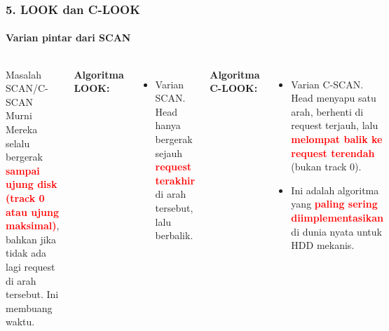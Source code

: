 \documentclass[t,aspectratio=169,xcolor=dvipsnames]{beamer}
\newcommand{\tem}[1]{\textbf{\textcolor{red}{#1}}}
\begin{document}
\begin{frame}
    \frametitle{5. LOOK dan C-LOOK}
    \framesubtitle{Varian pintar dari SCAN}
    \small
    \begin{columns}[T]
        \begin{block}{Masalah SCAN/C-SCAN Murni}
            Mereka selalu bergerak \tem{sampai ujung disk (track 0 atau ujung maksimal)}, bahkan jika tidak ada lagi request di arah tersebut. Ini membuang waktu.
        \end{block}
        
        \textbf{Algoritma LOOK:}
        \begin{itemize}
            \item Varian SCAN. Head hanya bergerak sejauh \tem{request terakhir} di arah tersebut, lalu berbalik.
        \end{itemize}

        \textbf{Algoritma C-LOOK:}
        \begin{itemize}
            \item Varian C-SCAN. Head menyapu satu arah, berhenti di request terjauh, lalu \tem{melompat balik ke request terendah} (bukan track 0).
            \item Ini adalah algoritma yang \tem{paling sering diimplementasikan} di dunia nyata untuk HDD mekanis.
        \end{itemize}
    \end{columns}
\end{frame}
\end{document}

